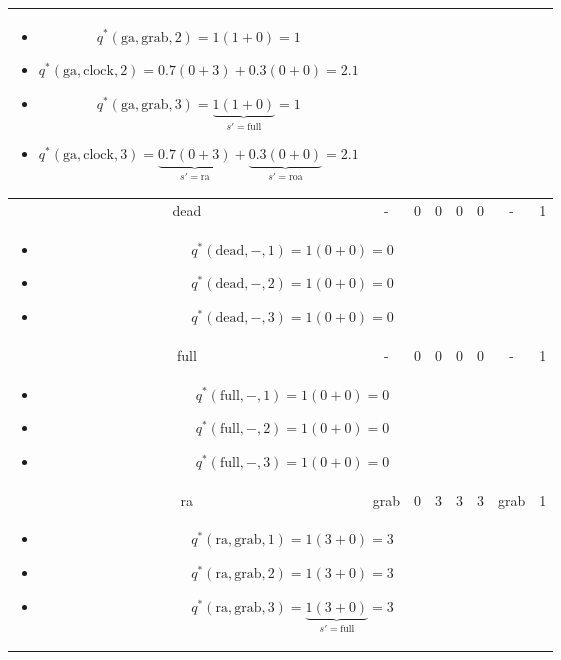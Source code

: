 \begin{example}
\begin{center}
\begin{tabular}{cccccccc}
{\begin{itemize}
                \item $q^*(\text{ga}, \text{grab}, 2) = 1(1 + 0) = 1$
                \item $q^*(\text{ga}, \text{clock}, 2) = 0.7(0 + 3) + 0.3(0 + 0) = 2.1$
                \item $q^*(\text{ga}, \text{grab}, 3) = \underbrace{1(1 + 0)}_{\text{$s'=$full}} = 1$
                \item $q^*(\text{ga}, \text{clock}, 3) = \underbrace{0.7(0 + 3)}_{\text{$s'=$ra}} + \underbrace{0.3(0 + 0)}_{\text{$s'=$roa}} = 2.1$
            \end{itemize}} \\
            \midrule
            dead & - & 0 & 0 & 0 & 0 & - & 1\\
            \multicolumn{8}{p{\linewidth}}{
            \begin{itemize}
                \item $q^*(\text{dead}, -, 1) = 1(0 + 0) = 0$
                \item $q^*(\text{dead}, -, 2) = 1(0 + 0) = 0$
                \item $q^*(\text{dead}, -, 3) = 1(0 + 0) = 0$
            \end{itemize}} \\
            \midrule
            full & - & 0 & 0 & 0 & 0 & - & 1\\
            \multicolumn{8}{p{\linewidth}}{
            \begin{itemize}
                \item $q^*(\text{full}, -, 1) = 1(0 + 0) = 0$
                \item $q^*(\text{full}, -, 2) = 1(0 + 0) = 0$
                \item $q^*(\text{full}, -, 3) = 1(0 + 0) = 0$
            \end{itemize}} \\
            \midrule 
            ra & grab & 0 & 3 & 3 & 3 & grab & 1 \\
            \multicolumn{8}{p{\linewidth}}{
            \begin{itemize}
                \item $q^*(\text{ra}, \text{grab}, 1) = 1(3 + 0) = 3$
                \item $q^*(\text{ra}, \text{grab}, 2) = 1(3 + 0) = 3$
                \item $q^*(\text{ra}, \text{grab}, 3) = \underbrace{1(3 + 0)}_{\text{$s'=$full}} = 3$
            \end{itemize}} \\

\end{tabular}
\end{center}
\end{example}
